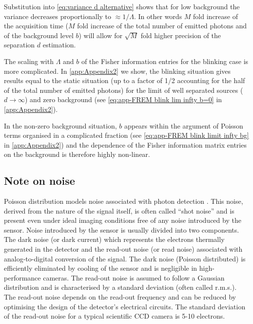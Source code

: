 Substitution into \autoref{eq:variance d alternative} shows that for low background the variance decreases proportionally to $\approx1/\Lambda$. In other words $M$ fold increase of the acquisition time ($M$ fold increase of the total number of emitted photons and of the background level $b$) will allow for $\sqrt{M}$ fold higher precision of the separation $d$ estimation.

The scaling with $\Lambda$ and $b$ of the Fisher information entries for the blinking case is more complicated. In \autoref{app:Appendix2} we show, the blinking situation gives results equal to the static situation (up to a factor of 1/2 accounting for the half of the total number of emitted photons) for the limit of well separated sources ($d\rightarrow\infty$) and zero background (see \autoref{eq:app-FREM blink lim infty b=0} in \autoref{app:Appendix2}). 

In the non-zero background situation, $b$ appears within the argument of Poisson terms organised in a complicated fraction (see \autoref{eq:app-FREM blink limit infty bg} in \autoref{app:Appendix2}) and the dependence of the Fisher information matrix entries on the background is therefore highly non-linear.  


\subsection{Note on noise}

Poisson distribution models noise associated with photon detection \cite{PawleyHandbook2006}. This noise, derived from the nature of the signal itself, is often called ``shot noise'' and is present even under ideal imaging conditions free of any noise introduced by the sensor. Noise introduced by the sensor is usually divided into two components. The dark noise (or dark current) which represents the electrons thermally generated in the detector and the read-out noise (or read noise) associated with analog-to-digital conversion of the signal. The dark noise (Poisson distributed) is efficiently eliminated by cooling of the sensor and is negligible in high-performance cameras.  The read-out noise is assumed to follow a Gaussian distribution and is characterised by a standard deviation (often called r.m.s.).  The read-out noise depends on the read-out frequency and can be reduced by optimising the design of the detector's electrical circuits. The standard deviation of the read-out noise for a typical scientific CCD camera is 5-10 electrons. 


